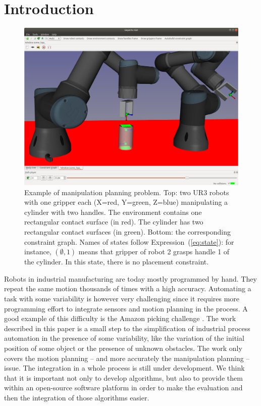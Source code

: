 \section{Introduction}

\begin{figure}
  \begin{center}
    \includegraphics[width=\linewidth]{figures/example.png}
    \def\svgwidth{\columnwidth}
    \graphicspath{{./figures/}}
    
  \end{center}
  \caption{{\color{blue} Example of manipulation planning problem.} Top: two UR3 robots with one gripper each (X=red, Y=green, Z=blue) manipulating a cylinder with two handles. The environment contains one rectangular contact surface (in red). The cylinder has two rectangular contact surfaces (in green).
  Bottom: the corresponding constraint graph. Names of states follow Expression~(\ref{eq:state}): for instance, $(\emptyset,1)$ means that gripper of robot 2 grasps handle 1 of the cylinder. In this state, there is no placement constraint.}
  \label{fig:2ur3-cylinder}
\end{figure}

Robots in industrial manufacturing are today mostly programmed by
hand. They repeat the same motion thousands of times with a high
accuracy. Automating a task with some variability is however very
challenging since it requires more programming effort to integrate
sensors and motion planning in the process. A good example of this difficulty is
the Amazon picking challenge \cite{brock-2018}. The work described in this
paper is a small step to the simplification of industrial process
automation in the presence of some variability, like the variation of
the initial position of some object or the presence of unknown
obstacles. The work only covers the motion planning -- and
more accurately the manipulation planning -- issue. The integration in a whole
process is still under development. We think that it
is important not only to develop algorithms, but also to provide them
within an open-source software platform in order to make the
evaluation and then the integration of those algorithms easier.

